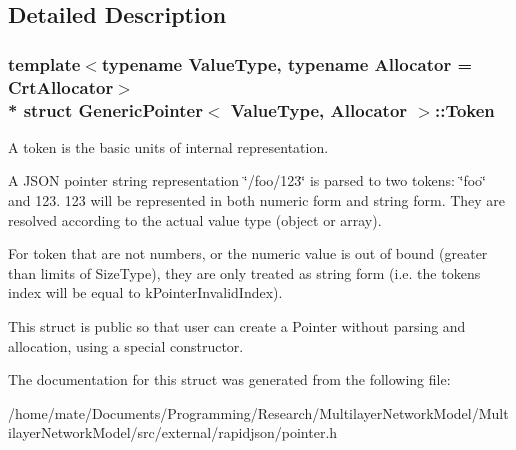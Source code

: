 \subsection{Detailed Description}
\subsubsection*{template$<$typename Value\+Type, typename Allocator = Crt\+Allocator$>$\\*
struct Generic\+Pointer$<$ Value\+Type, Allocator $>$\+::\+Token}

A token is the basic units of internal representation. 

A J\+S\+ON pointer string representation \char`\"{}/foo/123\char`\"{} is parsed to two tokens\+: \char`\"{}foo\char`\"{} and 123. 123 will be represented in both numeric form and string form. They are resolved according to the actual value type (object or array).

For token that are not numbers, or the numeric value is out of bound (greater than limits of Size\+Type), they are only treated as string form (i.\+e. the token\textquotesingle{}s index will be equal to k\+Pointer\+Invalid\+Index).

This struct is public so that user can create a Pointer without parsing and allocation, using a special constructor. 

The documentation for this struct was generated from the following file\+:\begin{DoxyCompactItemize}
\item 
/home/mate/\+Documents/\+Programming/\+Research/\+Multilayer\+Network\+Model/\+Multilayer\+Network\+Model/src/external/rapidjson/pointer.\+h\end{DoxyCompactItemize}
